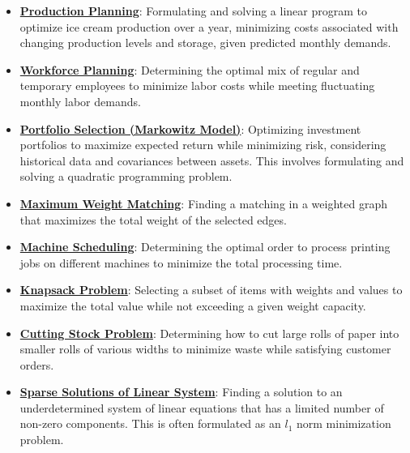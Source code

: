 \documentclass{article}%
\begin{document}
\begin{itemize}[leftmargin=*]%
\item \href{https://www.math.purdue.edu/~yipn/421/2024-10-28-ApplsLinProg.pdf#page=3}{\textbf{Production Planning}}: Formulating and solving a linear program to optimize ice cream production over a year, minimizing costs associated with changing production levels and storage, given predicted monthly demands.%
\item \href{https://www.math.purdue.edu/~yipn/421/2024-10-28-ApplsLinProg.pdf#page=7}{\textbf{Workforce Planning}}: Determining the optimal mix of regular and temporary employees to minimize labor costs while meeting fluctuating monthly labor demands.%
\item \href{https://www.math.purdue.edu/~yipn/421/2024-10-28-ApplsLinProg.pdf#page=9}{\textbf{Portfolio Selection (Markowitz Model)}}: Optimizing investment portfolios to maximize expected return while minimizing risk, considering historical data and covariances between assets. This involves formulating and solving a quadratic programming problem.%
\item \href{https://www.math.purdue.edu/~yipn/421/2024-10-28-ApplsLinProg.pdf#page=19}{\textbf{Maximum Weight Matching}}: Finding a matching in a weighted graph that maximizes the total weight of the selected edges.%
\item \href{https://www.math.purdue.edu/~yipn/421/2024-10-28-ApplsLinProg.pdf#page=22}{\textbf{Machine Scheduling}}: Determining the optimal order to process printing jobs on different machines to minimize the total processing time.%
\item \href{https://www.math.purdue.edu/~yipn/421/2024-10-28-ApplsLinProg.pdf#page=24}{\textbf{Knapsack Problem}}: Selecting a subset of items with weights and values to maximize the total value while not exceeding a given weight capacity.%
\item \href{https://www.math.purdue.edu/~yipn/421/2024-10-28-ApplsLinProg.pdf#page=25}{\textbf{Cutting Stock Problem}}: Determining how to cut large rolls of paper into smaller rolls of various widths to minimize waste while satisfying customer orders.%
\item \href{https://www.math.purdue.edu/~yipn/421/2024-10-28-ApplsLinProg.pdf#page=30}{\textbf{Sparse Solutions of Linear System}}: Finding a solution to an underdetermined system of linear equations that has a limited number of non-zero components. This is often formulated as an $l_1$ norm minimization problem.%
\end{itemize}%
\end{document}
